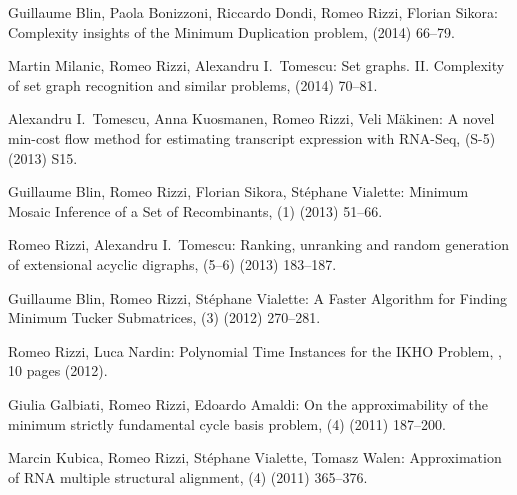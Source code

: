 \begin{etaremune}
  \item {\sc Guillaume Blin, Paola Bonizzoni, Riccardo Dondi, Romeo Rizzi, Florian Sikora:}
   \newblock  Complexity insights of the Minimum Duplication problem,
    (2014) 66--79.

  \item {\sc Martin Milanic, Romeo Rizzi, Alexandru I.~Tomescu:}
   \newblock  Set graphs. II. Complexity of set graph recognition and similar problems,
    (2014) 70--81. 

  \item {\sc Alexandru I.~Tomescu, Anna Kuosmanen, Romeo Rizzi, Veli M\"akinen:}
   \newblock  A novel min-cost flow method for estimating transcript expression with RNA-Seq,
   (S-5) (2013) S15. 

  \item {\sc Guillaume Blin, Romeo Rizzi, Florian Sikora, St\'ephane Vialette:}
   \newblock  Minimum Mosaic Inference of a Set of Recombinants,
   (1) (2013) 51--66.

  \item {\sc Romeo Rizzi, Alexandru I.~Tomescu:}
   \newblock  Ranking, unranking and random generation of extensional acyclic digraphs,
   (5--6) (2013) 183--187. 

  \item {\sc Guillaume Blin, Romeo Rizzi, St\'ephane Vialette:}
   \newblock  A Faster Algorithm for Finding Minimum Tucker Submatrices,
   (3) (2012) 270--281.

  \item {\sc Romeo Rizzi, Luca Nardin:}
   \newblock  Polynomial Time Instances for the IKHO Problem,
   , 10 pages (2012).

  \item {\sc Giulia Galbiati, Romeo Rizzi, Edoardo Amaldi:}
   \newblock  On the approximability of the minimum strictly fundamental cycle basis problem,
   (4) (2011) 187--200.

  \item {Marcin Kubica, Romeo Rizzi, St\'ephane Vialette, Tomasz Walen:}
   \newblock Approximation of RNA multiple structural alignment,
   (4) (2011) 365--376.


\end{etaremune}
